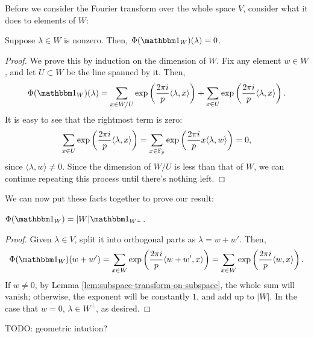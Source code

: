 Before we consider the Fourier transform over the whole space $V$, consider what
it does to elements of $W$:
\begin{lem}
    \label{lem:subspace-transform-on-subspace}
    Suppose $\lambda\in W$ is nonzero. Then, $\Phi(\IND_W)(\lambda) = 0$.
    \begin{proof}
        We prove this by induction on the dimension of $W$. Fix any element $w\in W$,
        and let $U\subset W$ be the line spanned by it. Then,   
        \[ \Phi(\IND_W)(\lambda) = 
            \sum_{x\in W/U} 
                \exp \left(\frac{2\pi i}{p} \langle \lambda, x \rangle\right) +
            \sum_{x\in U} 
                \exp \left(\frac{2\pi i}{p} \langle \lambda, x \rangle\right). \]
        It is easy to see that the rightmost term is zero:
        \[ \sum_{x\in U} 
                \exp \left(\frac{2\pi i}{p} \langle \lambda, x \rangle\right) =
            \sum_{x\in \mathbb{F}_p} 
                \exp \left(\frac{2\pi i}{p} x \langle \lambda, w \rangle\right) = 0,
                \]
        since $\langle \lambda, w \rangle \neq 0$. Since the dimension of $W/U$ is less
        than that of $W$, we can continue repeating this process until there's nothing left.
    \end{proof}
\end{lem}
We can now put these facts together to prove our result:
\begin{thm}\label{thm:FT-subspace}
    $\Phi(\IND_W) = |W| \IND_{W^\perp}$.
    \begin{proof}
        Given $\lambda\in V$, split it into orthogonal parts as $\lambda = w + w'$. Then,
        \[ \Phi(\IND_W)(w + w') = 
            \sum_{x\in W} 
                \exp \left(\frac{2\pi i}{p} \langle w + w', x \rangle\right) = 
            \sum_{x\in W} 
                \exp \left(\frac{2\pi i}{p} \langle w, x \rangle\right). \]
        If $w\neq 0$, by Lemma \ref{lem:subspace-transform-on-subspace}, the whole
        sum will vanish; otherwise, the exponent will be constantly $1$, and add up to
        $|W|$. In the case that $w = 0$, $\lambda\in W^\perp$, as desired.
    \end{proof}
\end{thm}
TODO: geometric intution?
